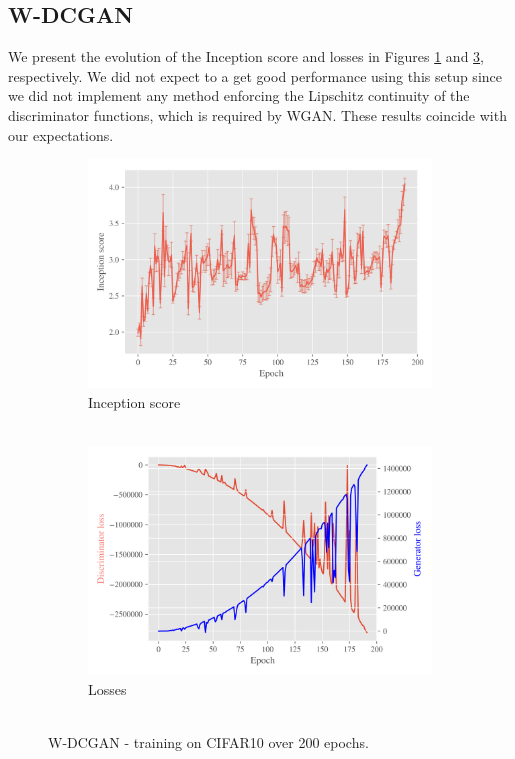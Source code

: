 \subsection{W-DCGAN}
\label{sec:exp-w-dcgan}
We present the evolution of the Inception score and losses in Figures \ref{fig:exp-w-dcgan-is} and \ref{fig:exp-w-dcgan-losses}, respectively. We did not expect to a get good performance using this setup since we did not implement any method enforcing the Lipschitz continuity of the discriminator functions, which is required by WGAN. These results coincide with our expectations.
   
\begin{figure}[H]
    \centering
    \begin{subfigure}[t]{0.49\textwidth}
        \centering
		\includegraphics[width=\textwidth]{../code/results/figures/w-dcgan_cifar10_is.png}
		\caption{Inception score\\~}
		\label{fig:exp-w-dcgan-is}
    \end{subfigure}
    \begin{subfigure}[t]{0.49\textwidth}
        \centering
        \includegraphics[width=\textwidth]{../code/results/figures/w-dcgan_cifar10_losses.png}
		\caption{Losses\\~}
		\label{fig:exp-w-dcgan-losses}
    \end{subfigure}
    \caption{W-DCGAN - training on CIFAR10 over 200 epochs.}
\end{figure}

